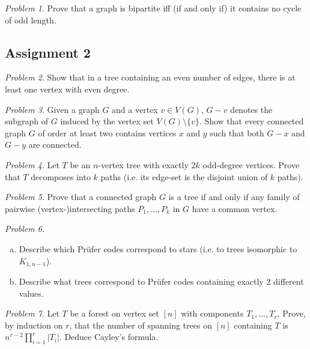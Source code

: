 \documentclass[11pt, fleqn, a4paper, landscape]{article}
\theoremstyle{plain} %
\theoremstyle{remark} %
\newtheorem{problem}{Problem}
\theoremstyle{definition} %
\begin{document}
\begin{multicols}{3}
\begin{problem}
Prove that a graph is bipartite iff (if and only if) it contains no cycle of odd length.
\end{problem}

\subsection{Assignment 2}

\begin{problem}
Show that in a tree containing an even number of edges, there is at least one
vertex with even degree.
\end{problem}

\begin{problem}
Given a graph $G$ and a vertex $v \in V (G)$, $G - v$ denotes the subgraph of $G$ induced by the vertex set $V (G)\setminus\{v\}$. Show that every connected graph $G$ of order at least two contains vertices $x$ and $y$ such that both $G- x$ and $G-y$ are connected.
\end{problem}

\begin{problem}
Let $T$ be an $n$-vertex tree with exactly $2k$ odd-degree vertices. Prove that $T$ decomposes into $k$ paths (i.e. its edge-set is the disjoint union of $k$ paths).
\end{problem}

\begin{problem}
Prove that a connected graph $G$ is a tree if and only if any family of pairwise (vertex-)intersecting paths $P_1,\dots,P_k$ in $G$ have a common vertex.
\end{problem}

\begin{problem}
\begin{enumerate}[(a)]
\item Describe which Prüfer codes correspond to stars (i.e. to trees isomorphic to $K_{1,n-1}$).
\item Describe what trees correspond to Prüfer codes containing exactly 2 different values.
\end{enumerate}
\end{problem}

\begin{problem}
Let $T$ be a forest on vertex set $[n]$ with components $T_1,\dots,T_r$. Prove, by induction on $r$, that the number of spanning trees on $[n]$ containing $T$ is $n^{r-2}\prod_{i=1}^{r}|T_i|$. Deduce Cayley's formula.
\end{problem}


\end{multicols}
\end{document}
